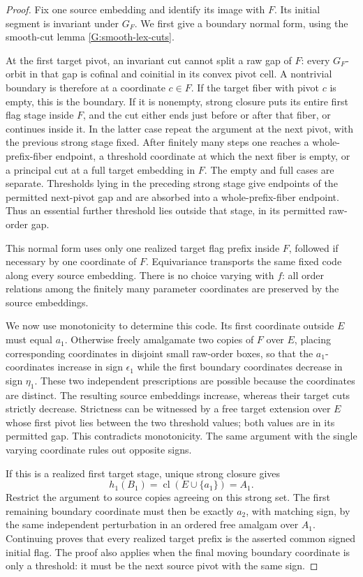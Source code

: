 \begin{proof}
Fix one source embedding and identify its image with $F$.
Its initial segment is invariant under $G_F$. We first give
a boundary normal form, using the smooth-cut lemma
\ref{G:smooth-lex-cuts}.

At the first target pivot, an invariant cut cannot split a
raw gap of $F$: every $G_F$-orbit in that gap is cofinal and
coinitial in its convex pivot cell. A nontrivial boundary is
therefore at a coordinate $c\in F$. If the target fiber with
pivot $c$ is empty, this is the boundary. If it is nonempty,
strong closure puts its entire first flag stage inside $F$,
and the cut either ends just before or after that fiber, or
continues inside it. In the latter case repeat the argument
at the next pivot, with the previous strong stage fixed.
After finitely many steps one reaches a whole-prefix-fiber
endpoint, a threshold coordinate at which the next fiber is
empty, or a principal cut at a full target embedding in $F$.
The empty and full cases are separate. Thresholds lying in
the preceding strong stage give endpoints of the permitted
next-pivot gap and are absorbed into a whole-prefix-fiber
endpoint. Thus an essential further threshold lies outside
that stage, in its permitted raw-order gap.

This normal form uses only one realized target flag prefix
inside $F$, followed if necessary by one coordinate of $F$.
Equivariance transports the same fixed code along every
source embedding. There is no choice varying with $f$:
all order relations among the finitely many parameter
coordinates are preserved by the source embeddings.

We now use monotonicity to determine this code. Its first
coordinate outside $E$ must equal $a_1$. Otherwise freely
amalgamate two copies of $F$ over $E$, placing corresponding
coordinates in disjoint small raw-order boxes, so that the
$a_1$-coordinates increase in sign $\epsilon_1$ while the
first boundary coordinates decrease in sign $\eta_1$.
These two independent prescriptions are possible because the
coordinates are distinct. The resulting source embeddings
increase, whereas their target cuts strictly decrease.
Strictness can be witnessed by a free target extension over
$E$ whose first pivot lies between the two threshold values;
both values are in its permitted gap. This contradicts
monotonicity. The same argument with the single varying
coordinate rules out opposite signs.

If this is a realized first target stage, unique strong
closure gives
\[
 h_1(B_1)=\operatorname{cl}(E\cup\{a_1\})=A_1.
\]
Restrict the argument to source copies agreeing on this
strong set. The first remaining boundary coordinate must
then be exactly $a_2$, with matching sign, by the same
independent perturbation in an ordered free amalgam over
$A_1$. Continuing proves that every realized target prefix
is the asserted common signed initial flag. The proof also
applies when the final moving boundary coordinate is only
a threshold: it must be the next source pivot with the
same sign.


\end{proof}
